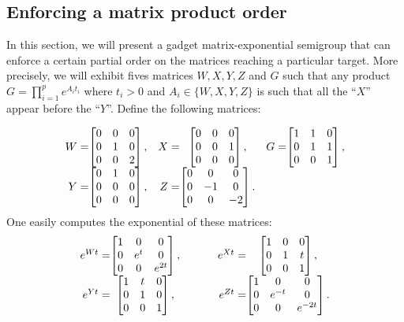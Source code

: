 \subsection{Enforcing a matrix product order}

In this section, we will present a gadget matrix-exponential semigroup that can
enforce a certain partial order on the matrices reaching a particular target.
More precisely, we will exhibit fives matrices $W,X,Y,Z$ and $G$ such that any
product $G=\prod_{i=1}^pe^{A_it_i}$
where $t_i>0$ and $A_i\in\{W,X,Y,Z\}$ is such that all the ``$X$'' appear before
the ``$Y$''. Define the following matrices:

\[
\begin{array}{r@{}c@{}cr@{}c@{}cr@{}c}
W=&\begin{bmatrix}0&0&0\\0&1&0\\0&0&2\end{bmatrix},&&
X=&\begin{bmatrix}0&0&0\\0&0&1\\0&0&0\end{bmatrix},&&
G=&\begin{bmatrix}1&1&0\\0&1&1\\0&0&1\end{bmatrix},\\
Y=&\begin{bmatrix}0&1&0\\0&0&0\\0&0&0\end{bmatrix},&&
Z=&\begin{bmatrix}0&0&0\\0&-1&0\\0&0&-2\end{bmatrix}.&&&
\end{array}
\]
One easily computes the exponential of these matrices:
\[
\begin{array}{r@{}cp{.5cm}r@{}c}
e^{Wt}=&\begin{bmatrix}1&0&0\\0&e^t&0\\0&0&e^{2t}\end{bmatrix},&&
e^{Xt}=&\begin{bmatrix}1&0&0\\0&1&t\\0&0&1\end{bmatrix},\\
e^{Yt}=&\begin{bmatrix}1&t&0\\0&1&0\\0&0&1\end{bmatrix},&&
e^{Zt}=&\begin{bmatrix}1&0&0\\0&e^{-t}&0\\0&0&e^{-2t}\end{bmatrix}.
\end{array}
\]

